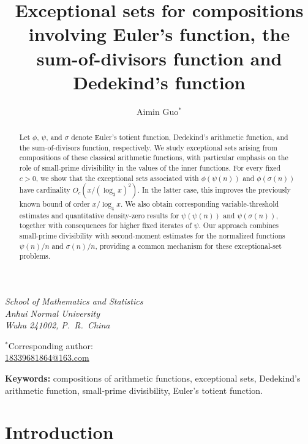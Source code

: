 \documentclass{article}
\title{Exceptional sets for compositions involving Euler's function,
the sum-of-divisors function and Dedekind's function
}
\author{Aimin Guo$^{*}$}
\date{}
\theoremstyle{remark}
\begin{document}
\maketitle

\vspace{-2.0em}

\begin{center}
\small

\textit{School of Mathematics and Statistics}\\
\textit{Anhui Normal University}\\
\textit{Wuhu 241002, P.~R.~China}

\vspace{0.4em}

$^{*}$Corresponding author:\\
\underline{18339681864@163.com}

\end{center}

\begin{abstract}
Let \(\phi\), \(\psi\), and \(\sigma\) denote Euler's totient function,
Dedekind's arithmetic function, and the sum-of-divisors function,
respectively. We study exceptional sets arising from compositions of
these classical arithmetic functions, with particular emphasis on the
role of small-prime divisibility in the values of the inner functions.
For every fixed \(c>0\), we show that the exceptional sets associated
with \(\phi(\psi(n))\) and \(\phi(\sigma(n))\) have cardinality
\(O_c(x/(\log_3 x)^2)\). In the latter case, this improves the previously
known bound of order \(x/\log_4 x\). We also obtain corresponding
variable-threshold estimates and quantitative density-zero results for
\(\psi(\psi(n))\) and \(\psi(\sigma(n))\), together with consequences
for higher fixed iterates of \(\psi\). Our approach combines
small-prime divisibility with second-moment estimates for the normalized
functions \(\psi(n)/n\) and \(\sigma(n)/n\), providing a common mechanism
for these exceptional-set problems.
\end{abstract}


\noindent\textbf{Keywords:}
compositions of arithmetic functions, exceptional sets,
Dedekind's arithmetic function, small-prime divisibility,
Euler's totient function.


\maketitle

\bigskip
\section{Introduction}
\end{document}
